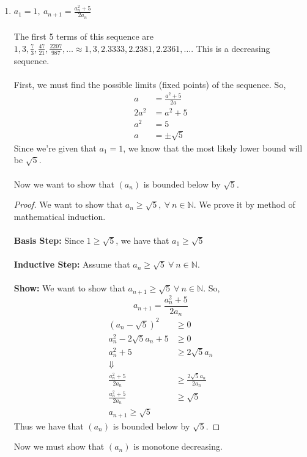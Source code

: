 \documentclass[12pt,letterpaper]{article}
\newcommand{\N}{\mathbb{N}}
\theoremstyle{case}
\theoremstyle{definition}
\begin{document}
\begin{enumerate}
\begin{enumerate}
		\item $a_1 = 1,\ a_{n+1}=\frac{a_n^2+5}{2a_n}$
		\\\\The first 5 terms of this sequence are $1, 3, \frac{7}{3}, \frac{47}{21}, \frac{2207}{987}, \dots \approx 1, 3, 2.3333, 2.2381, 2.2361, \dots$. This is a decreasing sequence.
		\\\\First, we must find the possible limits (fixed points) of the sequence. So,
		\begin{align*}
			a&=\frac{a^2+5}{2a} \\
			2a^2 &= a^2+5 \\
			a^2 &= 5 \\
			a &= \pm \sqrt{5}
		\end{align*}
		Since we're given that $a_1=1$, we know that the most likely lower bound will be $\sqrt{5}$.
		\\\\Now we want to show that $(a_n)$ is bounded below by $\sqrt{5}$.
		\begin{proof}
			We want to show that $a_n \geq \sqrt{5},\ \forall\ n \in \N$. We prove it by method of mathematical induction.
			\\\\\textbf{Basis Step:} Since $1 \geq \sqrt{5}$, we have that $a_1 \geq \sqrt{5}$
			\\\\\textbf{Inductive Step:} Assume that $a_n \geq \sqrt{5}\ \forall\ n \in \N$.
			\\\\\textbf{Show:} We want to show that $a_{n+1} \geq \sqrt{5}\ \forall\ n \in \N$. So, 
			\[a_{n+1} = \frac{a_n^2 + 5}{2a_n}\]
			\begin{align*}
				(a_n-\sqrt{5})^2 &\geq 0 \\
				a_n^2 -2\sqrt{5}a_n +5 &\geq 0 \\
				a_n^2 +5 &\geq 2\sqrt{5}a_n \\
				\Downarrow \\
				\frac{a_n^2+5}{2a_n} &\geq \frac{2\sqrt{5}a_n}{2a_n} \\
				\frac{a_n^2+5}{2a_n} &\geq \sqrt{5} \\
				a_{n+1} \geq \sqrt{5}
			\end{align*}
			Thus we have that $(a_n)$ is bounded below by $\sqrt{5}$.
		\end{proof}
		Now we must show that $(a_n)$ is monotone decreasing.\\

\end{enumerate}
\end{enumerate}
\end{document}
